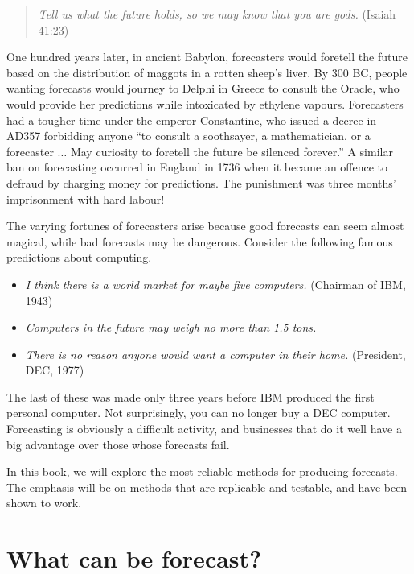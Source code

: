 \documentclass[]{book}
\providecommand{\tightlist}{%
  \setlength{\itemsep}{0pt}\setlength{\parskip}{0pt}}
\begin{document}
\begin{quote}
\emph{Tell us what the future holds, so we may know that you are gods.}
(Isaiah 41:23)
\end{quote}

One hundred years later, in ancient Babylon, forecasters would foretell the future based on the distribution of maggots in a rotten sheep's liver. By 300 BC, people wanting forecasts would journey to Delphi in Greece to consult the Oracle, who would provide her predictions while intoxicated by ethylene vapours. Forecasters had a tougher time under the emperor Constantine, who issued a decree in AD357 forbidding anyone ``to consult a soothsayer, a mathematician, or a forecaster \(\dots\) May curiosity to foretell the future be silenced forever.'' A similar ban on forecasting occurred in England in 1736 when it became an offence to defraud by charging money for predictions. The punishment was three months' imprisonment with hard labour!

The varying fortunes of forecasters arise because good forecasts can seem almost magical, while bad forecasts may be dangerous. Consider the following famous predictions about computing.

\begin{itemize}
\tightlist
\item
  \emph{I think there is a world market for maybe five computers.}
  (Chairman of IBM, 1943)
\item
  \emph{Computers in the future may weigh no more than 1.5 tons.}
\item
  \emph{There is no reason anyone would want a computer in their home.}
  (President, DEC, 1977)
\end{itemize}

The last of these was made only three years before IBM produced the first personal computer. Not surprisingly, you can no longer buy a DEC computer. Forecasting is obviously a difficult activity, and businesses that do it well have a big advantage over those whose forecasts fail.

In this book, we will explore the most reliable methods for producing forecasts. The emphasis will be on methods that are replicable and testable, and have been shown to work.

\hypertarget{what-can-be-forecast}{%
\section{What can be forecast?}\label{what-can-be-forecast}}
\end{document}
